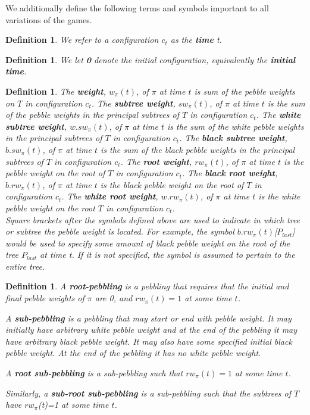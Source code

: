\documentclass[12pt]{article}
\newtheorem{definition}[theorem]{Definition}
\begin{document}
We additionally define the following terms and symbols important to all variations of the games.

\begin{definition}
We refer to a configuration $c_t$ as the {\bf time} t.
\end{definition}

\begin{definition}
We let {\bf 0} denote the initial configuration, equivalently the {\bf initial time}.
\end{definition}

\begin{definition}
The {\bf weight}, $w_\pi(t)$, of $\pi$ at time $t$ is sum of the
pebble weights on $T$ in configuration $c_t$. The {\bf subtree weight}, $sw_\pi(t)$, of $\pi$ at time $t$ is the sum of the pebble weights in the principal subtrees of $T$ in configuration $c_t$. 
The {\bf white subtree weight}, $w.sw_\pi(t)$, of $\pi$ at time $t$ is the sum of the white pebble weights in the principal subtrees of $T$ in configuration $c_t$. The {\bf black subtree weight}, $b.sw_\pi(t)$, of $\pi$ at time $t$ is the sum of the black pebble weights in the principal subtrees of $T$ in configuration $c_t$. The {\bf root weight}, $rw_\pi(t)$, of $\pi$ at time $t$ is the pebble weight on the root of $T$ in configuration $c_t$. The {\bf black root weight}, $b.rw_\pi(t)$, of $\pi$ at time $t$ is the black pebble weight on the root of $T$ in configuration $c_t$. The {\bf white root weight}, $w.rw_\pi(t)$, of $\pi$ at time $t$ is the white pebble weight on the root $T$ in configuration $c_t$.\\

\noindent
Square brackets after the symbols defined above are used to indicate in which tree or subtree the pebble weight is located. For example, the symbol $b.rw_\pi(t)$[$P_{last}$] would be used to specify some amount of black pebble weight on the root of the tree $P_{last}$ at time t. If it is not specified, the symbol is assumed to pertain to the entire tree.
\end{definition}

\begin{definition}
\noindent
A {\bf root-pebbling} is a pebbling that requires that the initial and final pebble weights of $\pi$ are 0, and 
$rw_\pi(t)=1$ at some time $t$. 

\noindent
A {\bf sub-pebbling} is a pebbling that may start or end with pebble weight. It may initially have arbitrary white pebble weight and at the end of the pebbling it may have arbitrary black pebble weight. It may also have some specified initial black pebble weight. At the end of the pebbling it has no white pebble weight.

\noindent
A {\bf root sub-pebbling} is a sub-pebbling such that $rw_\pi(t)=1$ at some time $t$. 

\noindent
Similarly, a {\bf sub-root sub-pebbling} is a sub-pebbling such that the subtrees of $T$ have $rw_\pi$(t)=1 at some time $t$.
\end{definition}
\end{document}
